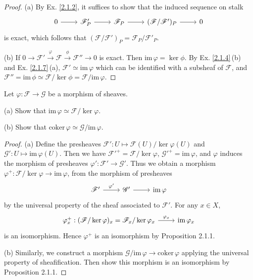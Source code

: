 \begin{proof}
	(a) By Ex. \ref{2.1.2}, it suffices to show that the induced sequence on stalk
	\begin{equation*}
		\begin{tikzcd}
			0 \arrow[r] & \mathscr{F}^{\prime}_P \arrow[r] & \mathscr{F}_P \arrow[r] & (\mathscr{F}/\mathscr{F}^{\prime})_P \arrow[r] & 0
		\end{tikzcd}
	\end{equation*}
	is exact, which follows that $(\mathscr{F}/\mathscr{F}')_{P}=\mathscr{F}_P/\mathscr{F}'_P$.
	
	(b) If $0 \rightarrow \mathscr{F}' \xrightarrow{\varphi} \mathscr{F} \xrightarrow{\phi} \mathscr{F}'' \rightarrow 0$ is exact. Then $\mathrm{im}\,{\varphi} = \ker{\phi}$. By Ex. \ref{2.1.4}\,(b) and Ex. \ref{2.1.7}\,(a), $\mathscr{F}'\simeq\mathrm{im}\,\varphi$ which can be identified with a subsheaf of $\mathscr{F}$, and $\mathscr{F}''=\mathrm{im}\,\phi\simeq \mathscr{F}/\ker\phi=\mathscr{F}/\mathrm{im}\,\varphi$.
\end{proof}
\begin{exe}
	\label{2.1.7}
	Let $\varphi:\mathscr{F}\to\mathscr{G}$ be a morphism of sheaves.
	
	(a) Show that $\mathrm{im}\,\varphi\simeq\mathscr{F}/\ker\varphi$.
	
	(b) Show that $\mathrm{coker}\,\varphi\simeq\mathscr{G}/\mathrm{im}\,\varphi$.
\end{exe}

\begin{proof}
	(a) Define the presheaves $\mathscr{F}':U\mapsto\mathscr{F}(U)/\ker\varphi(U)$ and $\mathscr{G}':U\mapsto\mathrm{im}\,\varphi(U)$. Then we have $\mathscr{F}'^+=\mathscr{F}/\ker\varphi$, $\mathscr{G}'^+=\mathrm{im}\,\varphi$, and $\varphi$ induces the morphism of presheaves $\varphi':\mathscr{F}'\to\mathscr{G}'$. Thus we obtain a morphism $\varphi^+:\mathscr{F}/\ker\varphi\rightarrow\mathrm{im}\,\varphi$, from the morphism of presheaves 
	\begin{equation*}
		\begin{tikzcd}
			\mathscr{F}^{\prime} \arrow[r, "\varphi^{\prime}"] & \mathscr{G}^{\prime} \arrow[r] & {\mathrm{im}\,\varphi}
		\end{tikzcd}
	\end{equation*}
	by the universal property of the sheaf associated to $\mathscr{F}'$. For any $x\in X$,
	\begin{equation*}
		\begin{tikzcd}
			\varphi^+_x:(\mathscr{F}/\ker\varphi)_x=\mathscr{F}_x/\ker\varphi_x \arrow[r, "\varphi_x"] & {\mathrm{im}\,\varphi_x}
		\end{tikzcd}
	\end{equation*}
	is an isomorphism. Hence $\varphi^+$ is an isomorphism by Proposition 2.1.1.
	
	(b) Similarly, we construct a morphism $\mathscr{G}/\mathrm{im}\,\varphi\to\mathrm{coker}\,\varphi$ applying the universal property of sheafification. Then show this morphism is an isomorphism by Proposition 2.1.1.
\end{proof}

